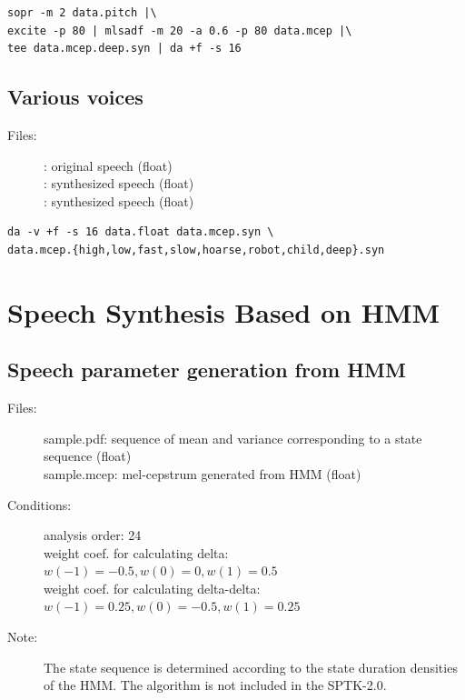 \documentclass[a4paper]{article}
\begin{document}
\begin{verbatim}
sopr -m 2 data.pitch |\
excite -p 80 | mlsadf -m 20 -a 0.6 -p 80 data.mcep |\
tee data.mcep.deep.syn | da +f -s 16
\end{verbatim}

\subsection{Various voices}

\begin{description}
\item[Files:]
  : 
  original speech (float)\\
  : 
  synthesized speech (float)\\
  : 
  synthesized speech (float)
\end{description}

\begin{verbatim}
da -v +f -s 16 data.float data.mcep.syn \
data.mcep.{high,low,fast,slow,hoarse,robot,child,deep}.syn
\end{verbatim}

\section{Speech Synthesis Based on HMM}

\subsection{Speech parameter generation from HMM}

\begin{description}
\item[Files:]
  sample.pdf: sequence of mean and variance
              corresponding to a state sequence (float)\\
  sample.mcep: mel-cepstrum generated from HMM (float)
\item[Conditions:]
  analysis order: 24\\
  weight coef. for calculating delta: $w(-1)=-0.5,w(0)=0,w(1)=0.5$\\
  weight coef. for calculating delta-delta: $w(-1)=0.25,w(0)=-0.5,w(1)=0.25$
\item[Note:]
  The state sequence is determined according to the state
  duration densities of the HMM.  The algorithm is not included
  in the SPTK-2.0.
\end{description}
\end{document}
